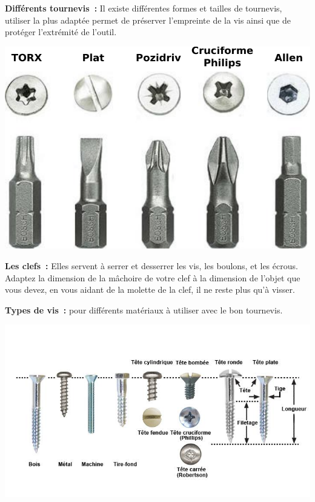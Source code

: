 
\textbf{Différents tournevis~:} Il existe différentes formes et tailles de tournevis, utiliser la plus adaptée permet de préserver l'empreinte de la vis ainsi que de protéger l'extrémité de l'outil.

\begin{center}
\includegraphics[width=\tailleImageTournevis]{pics/types-tournevis.pdf}
\end{center}

\textbf{Les clefs~:}  Elles servent à serrer et desserrer les vis, les boulons, et les écrous. Adaptez la dimension de la mâchoire de votre clef à la dimension de l'objet que vous devez, en vous aidant de la molette de la clef, il ne reste plus qu'à visser. 

\textbf{Types de vis~:} pour différents matériaux à utiliser avec le bon tournevis.

\begin{center}
\includegraphics[width=\tailleImageTournevis]{pics/types-vis.jpg}
\end{center}
